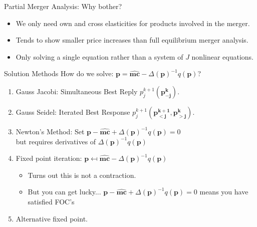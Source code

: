 \documentclass[xcolor=pdftex,dvipsnames,table,mathserif,aspectratio=169]{beamer}
\begin{document}
\begin{frame}{Partial Merger Analysis: Why bother?}
\begin{itemize}
\item We only need own and cross elasticities for products involved in the merger.
\item Tends to show smaller price increases than full equilibrium merger analysis.
\item Only solving a single equation rather than a system of $J$ nonlinear equations.
\end{itemize}
\end{frame} 



\begin{frame}{Solution Methods}
How do we solve: $\mathbf{p} = \widehat{\mathbf{mc}} - \Delta(\mathbf{p})^{-1}q(\mathbf{p})$?
\begin{enumerate}
\item Gauss Jacobi: Simultaneous Best Reply  $p_j^{k+1}(\mathbf{p_{-j}^k})$.
\item Gauss Seidel: Iterated Best Response  $p_j^{k+1}(\mathbf{p_{<j}^{k+1}},\mathbf{p_{>j}^{k}})$.
\item Newton's Method: Set $\mathbf{p} - \widehat{\mathbf{mc}} + \Delta(\mathbf{p})^{-1}q(\mathbf{p})=0$\\ but requires derivatives of $\Delta(\mathbf{p})^{-1}q(\mathbf{p})$
\item Fixed point iteration: $\mathbf{p} \mapsfrom \widehat{\mathbf{mc}} - \Delta(\mathbf{p})^{-1}q(\mathbf{p})$
\begin{itemize}
\item Turns out this is \alert{not a contraction}.
\item But you can get lucky... $\mathbf{p} - \widehat{\mathbf{mc}} + \Delta(\mathbf{p})^{-1}q(\mathbf{p})=0$ means you have satisfied FOC's
\end{itemize}
\item Alternative fixed point.
\end{enumerate}
\end{frame} 
\end{document}
